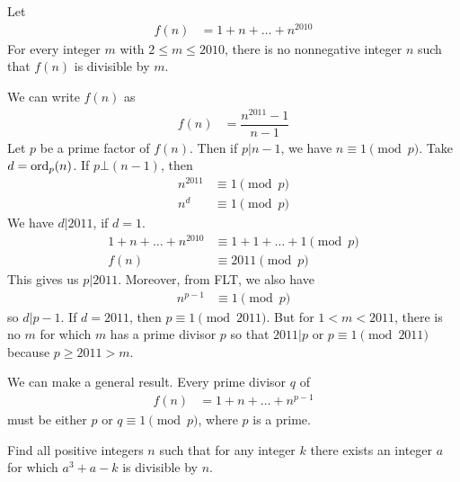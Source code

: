 \documentclass[problems.tex]{subfile}
\begin{document}
	\begin{problem}[Austria $2010$]
		Let	
			\begin{align*}
				f(n) & = 1+n+\ldots+n^{2010}
			\end{align*}
		For every integer $m$ with $2\leq m\leq2010$, there is no nonnegative integer $n$ such that $f(n)$ is divisible by $m$.
	\end{problem}
	
	\begin{solution}
		We can write $f(n)$ as
			\begin{align*}
				f(n) & = \dfrac{n^{2011}-1}{n-1}
			\end{align*}
		Let $p$ be a prime factor of $f(n)$. Then if $p|n-1$, we have $n\equiv1\pmod p$.  Take $d = \operatorname{ord}_p(n)$. If $p\bot (n-1)$, then 
			\begin{align*}
				n^{2011}&\equiv1\pmod p\\
				n^d&\equiv1\pmod p
			\end{align*}
		We have $d|2011$, if $d=1$. 
			\begin{align*}
				1+n+\ldots+n^{2010} & \equiv1+1+\ldots+1\pmod p\\
				f(n) & \equiv2011\pmod p
			\end{align*}
		This gives us $p|2011$. Moreover, from FLT, we also have 
			\begin{align*}
				n^{p-1}&\equiv1\pmod p
			\end{align*}
		so $d|p-1$. If $d=2011$, then $p\equiv1\pmod{2011}$. But for $1<m<2011$, there is no $m$ for which $m$ has a prime divisor $p$ so that $2011|p$ or $p\equiv1\pmod{2011}$ because $p\geq2011>m$.
	\end{solution}
	
	\begin{remark}
		We can make a general result. Every prime divisor $q$ of 
			\begin{align*}
				f(n) & = 1+n+\ldots+n^{p-1}
			\end{align*}
		must be either $p$ or $q\equiv1\pmod p$, where $p$ is a prime.
	\end{remark}
	
	\begin{problem}
		Find all positive integers $n$ such that for any integer $k$ there exists an integer $a$ for which $a^3 + a-k$ is divisible by $n$.
	\end{problem}
	
\end{document}

